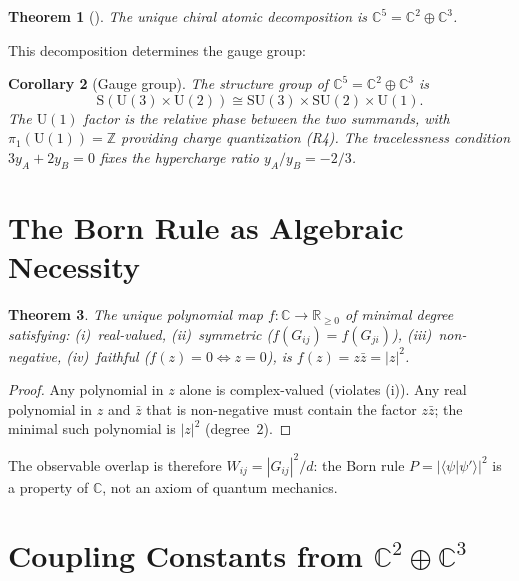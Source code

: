 \documentclass[12pt]{amsart}
\newtheorem{theorem}{Theorem}[section]
\newtheorem{corollary}[theorem]{Corollary}
\theoremstyle{definition}
\theoremstyle{remark}
\newcommand{\CC}{\mathbb{C}}
\newcommand{\RR}{\mathbb{R}}
\newcommand{\ZZ}{\mathbb{Z}}
\begin{document}
\begin{theorem}[{\cite[Theorem~5.1]{Paper1}}]
The unique chiral atomic decomposition is
$\CC^5 = \CC^2 \oplus \CC^3$.
\end{theorem}

This decomposition determines the gauge group:

\begin{corollary}[Gauge group]
\label{cor:gauge}
The structure group of
$\CC^5 = \CC^2 \oplus \CC^3$ is
\begin{equation}
\mathrm{S}(\mathrm{U}(3) \times \mathrm{U}(2))
\cong
\mathrm{SU}(3) \times \mathrm{SU}(2)
\times \mathrm{U}(1).
\end{equation}
The $\mathrm{U}(1)$ factor is the relative
phase between the two summands,
with $\pi_1(\mathrm{U}(1)) = \ZZ$
providing charge quantization (R4).
The tracelessness condition
$3 y_A + 2 y_B = 0$ fixes the
hypercharge ratio $y_A / y_B = -2/3$.
\end{corollary}

\section{The Born Rule as Algebraic Necessity}
\label{sec:born}

\begin{theorem}
The unique polynomial map
$f \colon \CC \to \RR_{\ge 0}$ of minimal degree
satisfying:
(i)~real-valued,
(ii)~symmetric ($f(G_{ij}) = f(G_{ji})$),
(iii)~non-negative,
(iv)~faithful ($f(z) = 0 \Leftrightarrow z = 0$),
is $f(z) = z\bar{z} = |z|^2$.
\end{theorem}

\begin{proof}
Any polynomial in $z$ alone is complex-valued
(violates (i)).
Any real polynomial in $z$ and $\bar{z}$
that is non-negative must contain the factor
$z\bar{z}$;
the minimal such polynomial is $|z|^2$
(degree~$2$).
\end{proof}

The observable overlap is therefore
$W_{ij} = |G_{ij}|^2 / d$:
the Born rule $P = |\langle \psi | \psi' \rangle|^2$
is a property of $\CC$, not an axiom
of quantum mechanics.

\section{Coupling Constants from $\CC^2 \oplus \CC^3$}
\label{sec:coupling}
\end{document}
